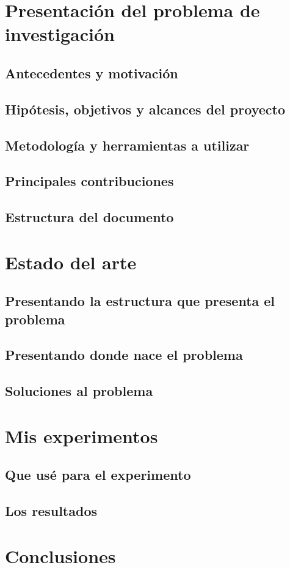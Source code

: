 \chapter{Presentación del problema de investigación}
\section{Antecedentes y motivación}
\section{Hipótesis, objetivos y alcances del proyecto}
\section{Metodología y herramientas a utilizar}
\section{Principales contribuciones}
\section{Estructura del documento}

\chapter{Estado del arte}
\section{Presentando la estructura que presenta el problema}
\section{Presentando donde nace el problema}
\section{Soluciones al problema}

\chapter{Mis experimentos}
\section{Que usé para el experimento}
\section{Los resultados}

\chapter{Conclusiones}

